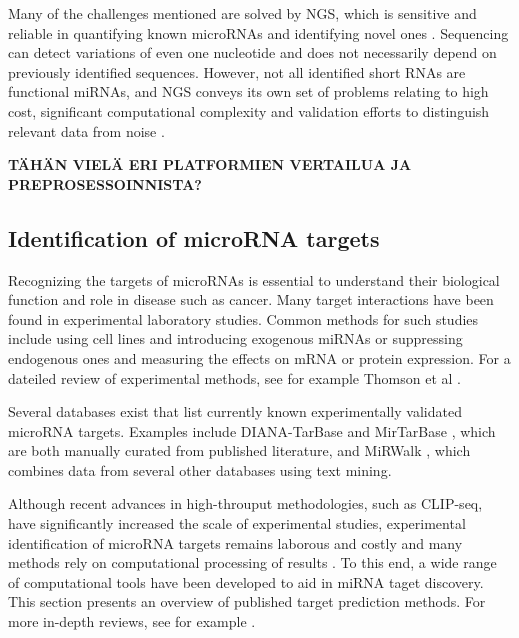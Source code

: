 Many of the challenges mentioned are solved by NGS, which is sensitive and
reliable in quantifying known microRNAs and identifying novel ones
\citep{Huang2011}. Sequencing can detect variations of even one nucleotide and
does not necessarily depend on previously identified sequences. However, not
all identified short RNAs are functional miRNAs, and NGS conveys its own set
of problems relating to high cost, significant computational complexity and
validation efforts to distinguish relevant data from noise
\citep{Chugh2012,Hunt2015}.

\textbf{TÄHÄN VIELÄ ERI PLATFORMIEN VERTAILUA JA PREPROSESSOINNISTA?}





\subsection{Identification of microRNA targets}




Recognizing the targets of microRNAs is essential to understand their
biological function and role in disease such as cancer. Many target
interactions have been found in experimental laboratory studies. Common
methods for such studies include using cell lines and introducing exogenous
miRNAs or suppressing endogenous ones and measuring the effects on mRNA or
protein expression. For a dateiled review of experimental methods, see for
example Thomson et al \citep{Thomson2011}.

Several databases exist that list currently known experimentally validated
microRNA targets. Examples include DIANA-TarBase \citep{Vlachos2015} and
MirTarBase \citep{Chou2016}, which are both manually curated from published
literature, and MiRWalk \citep{Dweep2015}, which combines data from several
other databases using text mining.

Although recent advances in high-throuput methodologies, such as CLIP-seq,
have significantly increased the scale of experimental studies, experimental
identification of microRNA targets remains laborous and costly and many
methods rely on computational processing of results \citep{Vlachos2015}. To
this end, a wide range of computational tools have been developed to aid in
miRNA taget discovery. This section presents an overview of published target
prediction methods. For more in-depth reviews, see for example
\citep{Yue2009,Muniategui2012}.




